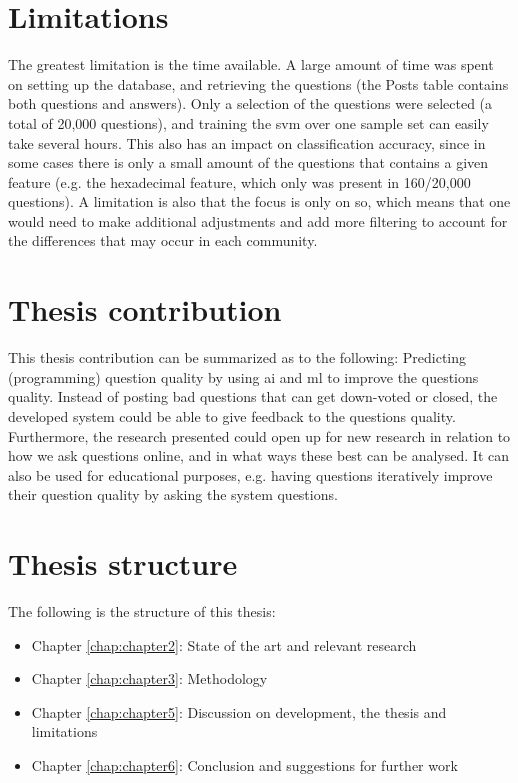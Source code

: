 \section{Limitations}
\label{sec:limitations}
The greatest limitation is the time available. 
A large amount of time was spent on setting up the database, and retrieving the questions (the Posts table contains both questions and answers).
Only a selection of the questions were selected (a total of 20,000 questions), and training the \gls{svm} over one sample set can easily take several hours. 
This also has an impact on classification accuracy, since in some cases there is only a small amount of the questions that contains a given feature 
(e.g. the hexadecimal feature, which only was present in 160/20,000 questions).
A limitation is also that the focus is only on \gls{so}, which means that one would need to make additional adjustments and add more filtering to account 
for the differences that may occur in each community.
 
\section{Thesis contribution}
\label{sec:thesis_contribution}
This thesis contribution can be summarized as to the following: 
Predicting (programming) question quality by  using \gls{ai} and \gls{ml} to improve the questions quality. 
Instead of posting bad questions that can get down-voted or closed, the developed system could be able to give feedback to the questions quality. 
Furthermore, the research presented could open up for new research in relation to how we ask questions online, and in what ways these best can be analysed.
It can also be used for educational purposes, e.g. having questions iteratively improve their question quality by asking the system questions.

\section{Thesis structure}
\label{sec:thesis_structure}
The following is the structure of this thesis:
\begin{itemize}
	\item Chapter \ref{chap:chapter2}: State of the art and relevant research
	\item Chapter \ref{chap:chapter3}: Methodology 
	\item Chapter \ref{chap:chapter5}: Discussion on development, the thesis and limitations
	\item Chapter \ref{chap:chapter6}: Conclusion and suggestions for further work
\end{itemize}
